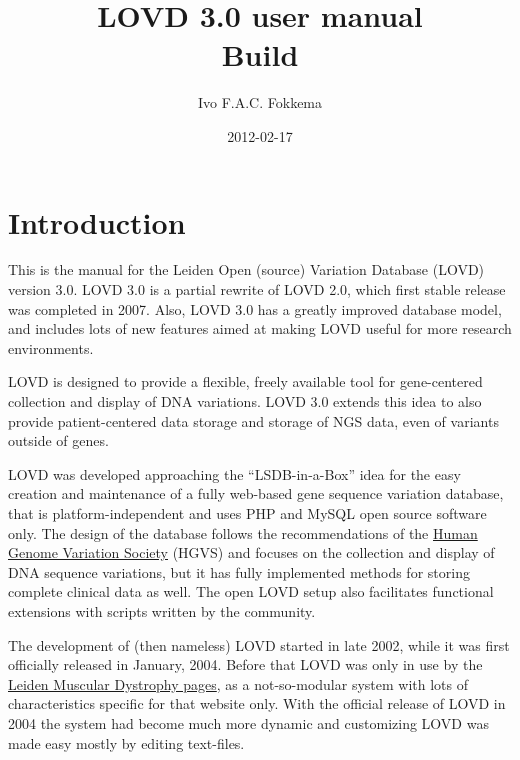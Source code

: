 \documentclass[a4paper,oneside,openany,12pt]{memoir}
\title{LOVD 3.0 user manual \\\vskip 1cm Build \LOVDversion}
\author{Ivo F.A.C. Fokkema}
\institute{Leiden University Medical Center}
\date{2012-02-17} %
\begin{document}
\begin{titlingpage} %
\maketitle
\end{titlingpage}





\tableofcontents





\chapter{Introduction}
This is the manual for the Leiden Open (source) Variation Database (LOVD) version 3.0.
LOVD 3.0 is a partial rewrite of LOVD 2.0, which first stable release was completed in 2007.
Also, LOVD 3.0 has a greatly improved database model, and includes lots of new features aimed at making LOVD useful for more research environments.
\par
LOVD is designed to provide a flexible, freely available tool for gene-centered collection and display of DNA variations.
LOVD 3.0 extends this idea to also provide patient-centered data storage and storage of NGS data, even of variants outside of genes.
\\\par
LOVD was developed approaching the ``LSDB-in-a-Box'' idea for the easy creation and maintenance of a fully web-based gene sequence variation database,
that is platform-independent and uses PHP and MySQL open source software only.
The design of the database follows the recommendations of the \href{http://www.hgvs.org/}{Human Genome Variation Society} (HGVS)
and focuses on the collection and display of DNA sequence variations, but it has fully implemented methods for storing complete clinical data as well.
The open LOVD setup also facilitates functional extensions with scripts written by the community.
\\\par
The development of (then nameless) LOVD started in late 2002, while it was first officially released in January, 2004.
Before that LOVD was only in use by the \href{http://www.DMD.nl/}{Leiden Muscular Dystrophy pages},
as a not-so-modular system with lots of characteristics specific for that website only.
With the official release of LOVD in 2004 the system had become much more dynamic and customizing LOVD was made easy mostly by editing text-files.
\end{document}
